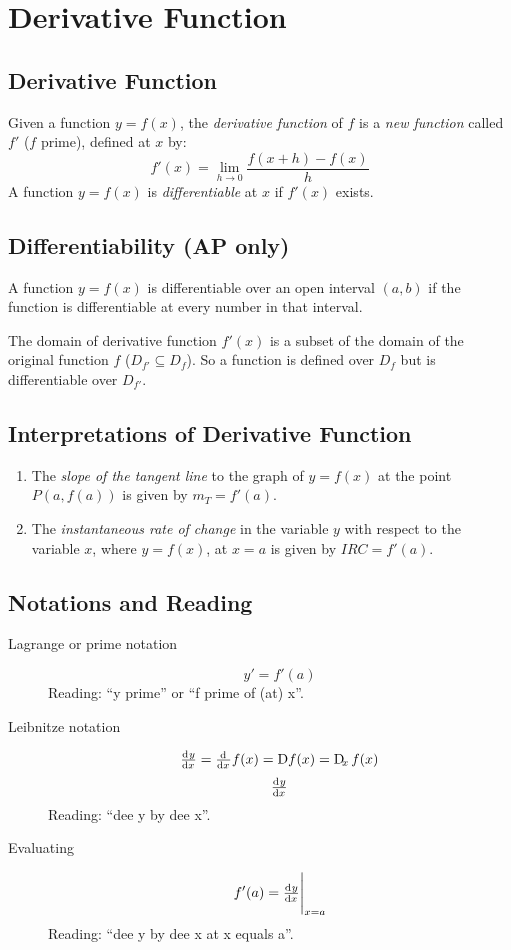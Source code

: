\section{Derivative Function}
\subsection{Derivative Function}
	Given a function $y=f(x)$, the \emph{derivative function} of $f$ is a \emph{new function} called $f'$ ($f$ prime), defined at $x$ by:
	\[f'(x) = \lim_{h \to 0} \frac{f(x+h) - f(x)}{h}\]
	A function $y=f(x)$ is \emph{differentiable} at $x$ if $f'(x)$ exists.
\subsection{Differentiability (AP only)}
	A function $y=f(x)$ is differentiable over an open interval $(a,b)$ if the function is differentiable at every number in that interval.

	The domain of derivative function $f'(x)$ is a subset of the domain of the original function $f$ ($D_{f'} \subseteq D_f$).
	So a function is defined over $D_f$ but is differentiable over $D_{f'}$.
\subsection{Interpretations of Derivative Function}
	\begin{enumerate}
		\item The \emph{slope of the tangent line} to the graph of $y=f(x)$ at the point $P(a,f(a))$ is given by $m_T = f'(a)$.
		\item The \emph{instantaneous rate of change} in the variable $y$ with respect to the variable $x$, where $y=f(x)$, at $x=a$ is given by $IRC = f'(a)$.
	\end{enumerate}
\subsection{Notations and Reading}
	\begin{description}
		\item[Lagrange or prime notation]
			\[y' = f'(a)\]
			Reading: ``y prime'' or ``f prime of (at) x''.
		\item[Leibnitze notation]
			\[\od{y}{x} = \od{}{x} f(x) = \Dif f(x) = \Dif_x f(x)\]
			\[\od{y}{x}\]
			Reading: ``dee y by dee x''.
		\item[Evaluating]
			\[\eval{f'(a) = \od{y}{x}}_{x=a}\]
			Reading: ``dee y by dee x at x equals a''.
	\end{description}
